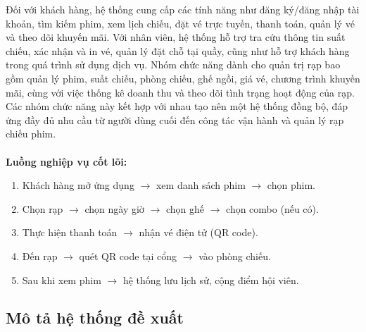 \documentclass[a4paper]{article}
\newcommand{\cach}{\hspace*{1.5em}\ignorespaces}
\begin{document}
\indent Đối với khách hàng, hệ thống cung cấp các tính năng như đăng ký/đăng nhập tài khoản, tìm kiếm phim, xem lịch chiếu, đặt vé trực tuyến, thanh toán, quản lý vé và theo dõi khuyến mãi. Với nhân viên, hệ thống hỗ trợ tra cứu thông tin suất chiếu, xác nhận và in vé, quản lý đặt chỗ tại quầy, cũng như hỗ trợ khách hàng trong quá trình sử dụng dịch vụ. Nhóm chức năng dành cho quản trị rạp bao gồm quản lý phim, suất chiếu, phòng chiếu, ghế ngồi, giá vé, chương trình khuyến mãi, cùng với việc thống kê doanh thu và theo dõi tình trạng hoạt động của rạp. Các nhóm chức năng này kết hợp với nhau tạo nên một hệ thống đồng bộ, đáp ứng đầy đủ nhu cầu từ người dùng cuối đến công tác vận hành và quản lý rạp chiếu phim.
\\
\\
\cach \textbf{Luồng nghiệp vụ cốt lõi:}
\begin{enumerate}
    \item Khách hàng mở ứng dụng $\rightarrow$ xem danh sách phim $\rightarrow$ chọn phim.
    \item Chọn rạp $\rightarrow$ chọn ngày giờ $\rightarrow$ chọn ghế $\rightarrow$ chọn combo (nếu có).
    \item Thực hiện thanh toán $\rightarrow$ nhận vé điện tử (QR code).
    \item Đến rạp $\rightarrow$ quét QR code tại cổng $\rightarrow$ vào phòng chiếu.
    \item Sau khi xem phim $\rightarrow$ hệ thống lưu lịch sử, cộng điểm hội viên.
\end{enumerate}

\subsection{Mô tả hệ thống đề xuất}
\end{document}
